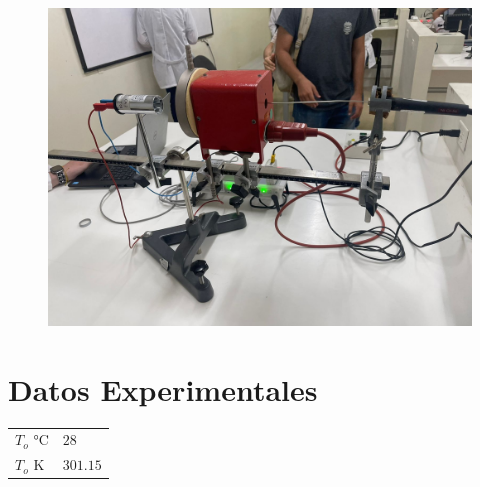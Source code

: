 \documentclass[letterpaper, 12pt]{article}
\begin{document}
\begin{figure}[H]
      \begin{center}
            \includegraphics[width=.9\linewidth]{./Images/Imagen1.jpeg}
            \caption{}
      \end{center}
\end{figure}

\section{Datos Experimentales}

\begin{table}[H]
      \begin{tabularx}{.9\linewidth}{|>{\centering\arraybackslash}X|>{\centering\arraybackslash}X|}
            \hline
            \multicolumn{2}{|c|}{Constantes} \\\hline
            $T_o$ °C & $28$                  \\\hline
            $T_o$ K  & $301.15$              \\\hline
      \end{tabularx}
\end{table}
\end{document}
